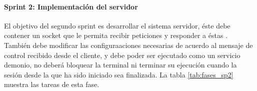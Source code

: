 \documentclass[12pt, twoside]{article}
\begin{document}
        \begin{table}[h!]             
            \centering                  
            \caption{Descripción del sprint 1}
            \label{tab:fases_sp1}
        \end{table}

        \paragraph{ Sprint 2: Implementación del servidor}
        El objetivo del segundo sprint es desarrollar el sistema servidor, éste debe contener un socket que le permita recibir peticiones y responder a éstas \cite{Socket}. También debe modificar las configuraaciones necesarias de acuerdo al mensaje de control recibido desde el cliente, y debe poder ser ejecutado como un servicio demonio, no deberá bloquear la terminal ni terminar su ejecución cuando la sesión desde la que ha sido iniciado sea finalizada. La tabla \ref{tab:fases_sp2} muestra las tareas de esta fase.
\end{document}
